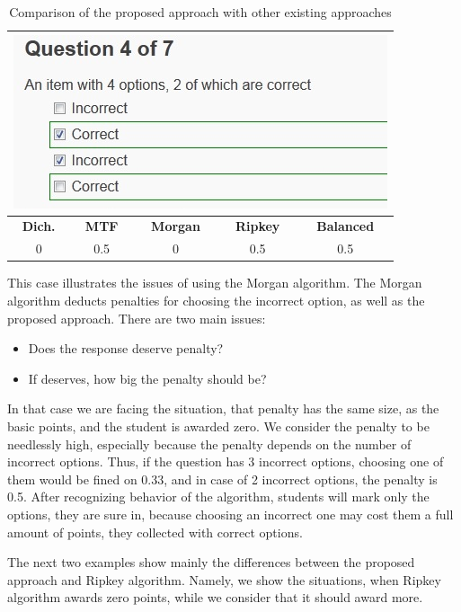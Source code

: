 \begin{table}[h!]
	\centering
	\begin{tabularx}{0.5\columnwidth}{c c c c c} 
	\toprule 
    \multicolumn{5}{c}{\includegraphics[width=0.5\columnwidth]{images/case4.jpg}}\\
    \midrule
    \textbf{Dich.}&\textbf{MTF}&\textbf{Morgan}&\textbf{Ripkey}&\textbf{Balanced}\\
	\midrule
    0&0.5&0&0.5&0.5\\
	\bottomrule
    \end{tabularx}
	\caption{Comparison of the proposed approach with other existing approaches}
	\label{tab:case 4}
\end{table}

\begin{example}
This case illustrates the issues of using the Morgan algorithm.
The Morgan algorithm deducts penalties for choosing the incorrect option, as well as the proposed approach.
There are two main issues:

\begin{itemize}
  \item Does the response deserve penalty?
  \item If deserves, how big the penalty should be?
\end{itemize}

In that case we are facing the situation, that penalty has the same size, as the basic points, and the student is awarded zero.
We consider the penalty to be needlessly high, especially because the penalty depends on the number of incorrect options.
Thus, if the question has 3 incorrect options, choosing one of them would be fined on 0.33, and in case of 2 incorrect options, the penalty is 0.5.
After recognizing behavior of the algorithm, students will mark only the options, they are sure in, because choosing an incorrect one may cost them a full amount of points, they collected with correct options.
\end{example}

The next two examples show mainly the differences between the proposed approach and Ripkey algorithm.
Namely, we show the situations, when Ripkey algorithm awards zero points, while we consider that it should award more. 

